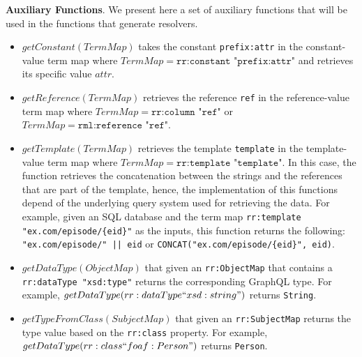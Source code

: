 \textbf{Auxiliary Functions}. We present here a set of auxiliary functions that will be used in the functions that generate resolvers.
\begin{itemize}
    \item $getConstant(TermMap)$ takes the constant \texttt{prefix:attr} in the constant-value term map where $TermMap = \texttt{rr:constant "prefix:attr"}$ and retrieves its specific value $attr$.
    \item $getReference(TermMap)$ retrieves the reference \texttt{ref} in the reference-value term map where $TermMap = \texttt{rr:column "ref"}$ or $TermMap = \texttt{rml:reference "ref"}$.
    \item $getTemplate(TermMap)$ retrieves the template \texttt{template} in the template-value term map where $TermMap = \texttt{rr:template "template"}$. In this case, the function retrieves the concatenation between the strings and the references that are part of the template, hence, the implementation of this functions depend of the underlying query system used for retrieving the data. For example, given an SQL database and the term map \texttt{rr:template "ex.com/episode/\{eid\}"} as the inputs, this function returns the following: \texttt{"ex.com/episode/" || eid} or \texttt{CONCAT("ex.com/episode/\{eid\}", eid)}.%
    \item $getDataType(ObjectMap)$ that given an \texttt{rr:ObjectMap} that contains a \texttt{rr:dataType "xsd:type"} returns the corresponding GraphQL type. For example, $getDataType(rr:dataType ``xsd:string")$ returns \texttt{String}.
    \item $getTypeFromClass(SubjectMap)$ that given an \texttt{rr:SubjectMap} returns the type value based on the \texttt{rr:class} property. For example, $getDataType(rr:class ``foaf:Person")$ returns \texttt{Person}. 
\end{itemize}

